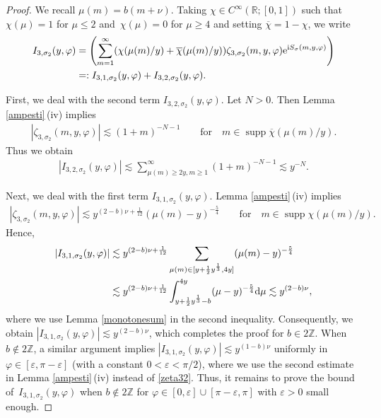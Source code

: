 \documentclass[pdftex]{sigma}
\numberwithin{equation}{section}
\def\R{\mathbb{R}}%
\DeclareMathOperator{\supp}{supp}%
\def\e{\varepsilon}
\def\f{\varphi}
\def\m{\mu}
\def\n{\nu}
\def\s{\sigma}
\def\z{\zeta}
\begin{document}
\begin{proof}We recall $\m(m)=b(m+\n)$. Taking $\chi\in C^{\infty}(\R;[0,1])$ such that $\chi(\m)=1$ for $\m\leq 2$ and~${\chi(\m)=0}$ for $\m\geq 4$ and setting $\overline{\chi}=1-\chi$, we write
\begin{align*}
I_{3,\s_2}(y,\f)&= \left(\sum_{m=1}^{\infty}(\chi(\m(m)/y)+\overline{\chi}(\m(m)/y)) \z_{3,\s_2}(m,y,\f){\rm e}^{{\rm i}S_{\s}(m,y,\f)} \right)\\
&=: I_{3,1,\s_2}(y,\f)+I_{3,2,\s_2}(y,\f).
\end{align*}

First, we deal with the second term $I_{3,2,\s_2}(y,\f)$. Let $N>0$. Then Lemma \ref{ampesti}\,(iv) implies
\begin{align*}
|\z_{3,\s_2}(m,y,\f)|\lesssim (1+m)^{-N-1}\qquad \text{for}\quad m\in \supp \overline{\chi}(\m(m)/y).
\end{align*}
Thus we obtain
\begin{align*}
|I_{3,2,\s_2}(y,\f)|\lesssim \sum_{\m(m)\geq 2y,m\geq 1}^{\infty}(1+m)^{-N-1}\lesssim y^{-N}.
\end{align*}

Next, we deal with the first term $I_{3,1,\s_2}(y,\f)$. Lemma \ref{ampesti}\,(iv) implies
\begin{align}\label{zeta32}
|\z_{3,\s_2}(m,y,\f)|\lesssim y^{(2-b)\n+\frac{1}{12}}(\m(m)-y)^{-\frac{5}{4}}\qquad \text{for}\quad m\in \supp \chi(\m(m)/y).
\end{align}
Hence,
\begin{align*}
|I_{3,1,\s_2}(y,\f)|\lesssim{}& y^{(2-b)\n+\frac{1}{12}}\sum_{\m(m)\in [y+\frac{1}{2}y^{\frac{1}{3}},4y]}(\m(m)-y)^{-\frac{5}{4}}\\
\lesssim{}& y^{(2-b)\n+\frac{1}{12}}\int_{y+\frac{1}{2}y^{\frac{1}{3}}-b}^{4y}(\m-y)^{-\frac{5}{4}}{\rm d}\m
\lesssim y^{(2-b)\n},
\end{align*}
where we use Lemma \ref{monotonesum} in the second inequality.
Consequently, we obtain $|I_{3,1,\s_2}(y,\f)|\lesssim y^{(2-b)\n}$, which completes the proof for $b\in 2\mathbb{Z}$. When $b\notin 2\mathbb{Z}$, a similar argument implies $|I_{3,1,\s_2}(y,\f)|\lesssim y^{(1-b)\n}$ uniformly in $ \f\in [\e,\pi-\e]$ (with a constant $0<\e<\pi/2$), where we use the second estimate in Lemma \ref{ampesti}\,(iv) instead of \eqref{zeta32}. Thus, it remains to prove the bound of~${I_{3,1,\s_2}(y,\f)}$ when $b\notin 2\mathbb{Z}$ for $\f\in [0,\e]\cup [\pi-\e,\pi]$ with $\e>0$ small enough.


\end{proof}
\end{document}
